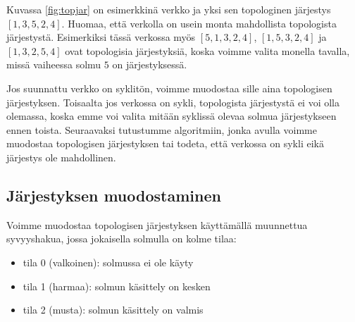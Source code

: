 Kuvassa \ref{fig:topjar} on esimerkkinä verkko ja yksi sen topologinen
järjestys $[1,3,5,2,4]$.
Huomaa, että verkolla on usein monta mahdollista
topologista järjestystä.
Esimerkiksi tässä verkossa myös $[5,1,3,2,4]$,
$[1,5,3,2,4]$ ja $[1,3,2,5,4]$
ovat topologisia järjestyksiä, koska voimme valita monella tavalla,
missä vaiheessa solmu $5$ on järjestyksessä.

Jos suunnattu verkko on syklitön, voimme muodostaa sille
aina topologisen järjestyksen.
Toisaalta jos verkossa on sykli,
topologista järjestystä ei voi olla olemassa,
koska emme voi valita mitään syklissä olevaa solmua
järjestykseen ennen toista.
Seuraavaksi tutustumme algoritmiin,
jonka avulla voimme muodostaa topologisen järjestyksen
tai todeta, että verkossa on sykli eikä järjestys ole mahdollinen.

\subsection{Järjestyksen muodostaminen}

Voimme muodostaa topologisen järjestyksen käyttämällä
muunnettua syvyyshakua, jossa jokaisella solmulla on kolme tilaa:

\begin{itemize}
\item tila 0 (valkoinen): solmussa ei ole käyty
\item tila 1 (harmaa): solmun käsittely on kesken
\item tila 2 (musta): solmun käsittely on valmis
\end{itemize}

